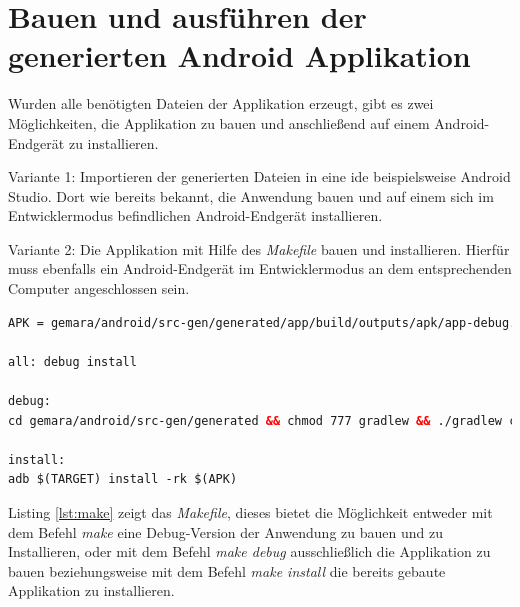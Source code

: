 \section{Bauen und ausführen der generierten Android Applikation}

Wurden alle benötigten Dateien der Applikation erzeugt, gibt es zwei Möglichkeiten, die Applikation zu bauen und anschließend auf einem Android-Endgerät zu installieren.

Variante 1: Importieren der generierten Dateien in eine \acf{ide} beispielsweise Android Studio. Dort wie bereits bekannt, die Anwendung bauen und auf einem sich im Entwicklermodus befindlichen Android-Endgerät installieren.

Variante 2: Die Applikation mit Hilfe des \textit{Makefile} bauen und installieren. Hierfür muss ebenfalls ein Android-Endgerät im Entwicklermodus an dem entsprechenden Computer angeschlossen sein.

\newpage

\begin{lstlisting}[label=lst:make,
language=xml,
firstnumber=1,
caption=\textit{Makefile} für das Bauen und Installieren der erzeugten Applikation.]				   
APK = gemara/android/src-gen/generated/app/build/outputs/apk/app-debug.apk

all: debug install

debug:
cd gemara/android/src-gen/generated && chmod 777 gradlew && ./gradlew clean assembleDebug

install:
adb $(TARGET) install -rk $(APK)
\end{lstlisting}

Listing \ref{lst:make} zeigt das \textit{Makefile}, dieses bietet die Möglichkeit entweder mit dem Befehl \textit{make} eine Debug-Version der Anwendung zu bauen und zu Installieren, oder mit dem Befehl \textit{make debug} ausschließlich die Applikation zu bauen beziehungsweise mit dem Befehl \textit{make install} die bereits gebaute Applikation zu installieren.
